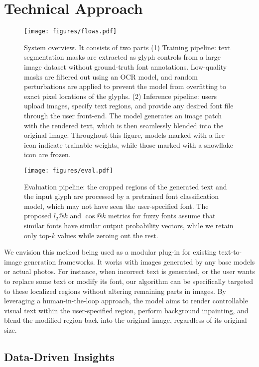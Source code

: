 \section{Technical Approach}

\begin{figure*}[!t]
    \centering
    \texttt{[image: figures/flows.pdf]}
    \caption{System overview. It consists of two parts (1) Training pipeline: text segmentation masks are extracted as glyph controls from a large image dataset without ground-truth font annotations. Low-quality masks are filtered out using an OCR model, and random perturbations are applied to prevent the model from overfitting to exact pixel locations of the glyphs. (2) Inference pipeline: users upload images, specify text regions, and provide any desired font file through the user front-end. The model generates an image patch with the rendered text, which is then seamlessly blended into the original image. Throughout this figure, models marked with a fire icon indicate trainable weights, while those marked with a snowflake icon are frozen.}
    \label{fig:flow}
\end{figure*}

\begin{figure}[t]
    \centering
    \texttt{[image: figures/eval.pdf]}
    \caption{Evaluation pipeline: the cropped regions of the generated text and the input glyph are processed by a pretrained font classification model, which may not have seen the user-specified font. The proposed $l_2@k$ and $\cos@k$ metrics for fuzzy fonts assume that similar fonts have similar output probability vectors, while we retain only top-$k$ values while zeroing out the rest.}
    \label{fig:eval}
\end{figure}


We envision this method being used as a modular plug-in for existing text-to-image generation frameworks. It works with images generated by any base models or actual photos. For instance, when incorrect text is generated, or the user wants to replace some text or modify its font, our algorithm can be specifically targeted to these localized regions without altering remaining parts in images. By leveraging a human-in-the-loop approach, the model aims to render controllable visual text within the user-specified region, perform background inpainting, and blend the modified region back into the original image, regardless of its original size.


\subsection{Data-Driven Insights}

